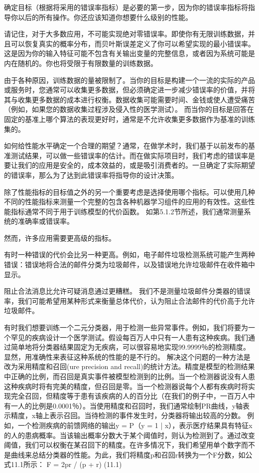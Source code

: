 确定目标（根据将采用的错误率指标）是必要的第一步，因为你的错误率指标将指导你以后的所有操作。你还应该知道你想要什么级别的性能。

请记住，对于大多数应用，不可能实现绝对零错误率。即使你有无限训练数据，并且可以恢复真实的概率分布，而贝叶斯误差定义了你可以希望实现的最小错误率。这是因为你的输入特征可能不包含有关输出变量的完整信息，或者因为系统可能是内在随机的。你也将受限于有限数量的训练数据。

由于各种原因，训练数据的量被限制了。当你的目标是构建一个一流的实际的产品或服务时，您通常可以收集更多数据，但必须确定进一步减少错误率的价值，并将其与收集更多数据的成本进行权衡。数据收集可能需要时间、金钱或使人遭受痛苦（例如，如果您的数据收集过程涉及侵入性的医学测试）。 而当你的目标是回答在固定的基准上哪个算法的表现更好时，通常是不允许收集更多数据作为基准的训练集的。

如何给性能水平确定一个合理的期望？通常，在做学术时，我们基于以前发布的基准测试结果，可以做一些错误率的估计。而在做实际项目时，我们考虑的错误率是要让我们的应用是安全的，成本效益的，或是吸引消费者的。一旦确定了实际期望的错误率，那么为了达到此错误率将指导你的设计决策。

除了性能指标的目标值之外的另一个重要考虑是选择使用哪个指标。可以使用几种不同的性能指标来测量一个完整的包含各种机器学习组件的应用的有效性。这些性能指标通常不同于用于训练模型的代价函数。 如第5.1.2节所述，我们通常测量系统的准确率或错误率。

然而，许多应用需要更高级的指标。

有时一种错误的代价会比另一种更高。例如，电子邮件垃圾检测系统可能产生两种错误：错误地将合法的邮件分类为垃圾邮件，以及错误地允许垃圾邮件在收件箱中显示。

阻止合法消息比允许可疑消息通过更糟糕。 我们不是测量垃圾邮件分类器的错误率，我们可能希望用某种形式来衡量总体代价，认为阻止合法邮件的代价高于允许垃圾邮件。

有时我们想要训练一个二元分类器，用于检测一些异常事件。例如，我们将要为一个罕见的疾病设计一个医学测试。假设每百万人中只有一人患有这种疾病。我们通过简单地将分类器结果固定为无疾病，可以很容易地实现99.9999％的检测精度。显然，用准确性来表征这种系统的性能的是不行的。 解决这个问题的一种方法是改为采用精度和召回(ure precision and recall)的统计方法。精度是模型的检测结果中正确的比例，而召回是真实事件被模型检测到的比例。当一个检测器说没有人患这种疾病时将有完美的精度，但召回是零。当一个检测器说每个人都有疾病时将实现完全召回，但精度等于患有该疾病的人的百分比（在我们的例子中，一百万人中有一人的比例是0.0001％）。当使用精度和召回时，我们通常绘制PR曲线，y轴表示精度，x轴上表示召回。当待检测的事件发生时，分类器将输出较高的分数。 例如，一个检测疾病的前馈网络的输出y = P（y = 1 | x），表示医疗结果具有特征x的人的患病概率。当该输出概率分数大于某个阈值时，则认为检测到了。通过改变阈值，我们可以权衡在某召回下的精度。在许多情况下，我们希望用单个数字而不是曲线来总结分类器的性能。为此，我们将精度p和召回r转换为一个F分数，如公式11.1所示：
F = 2pr / (p + r) (11.1)

